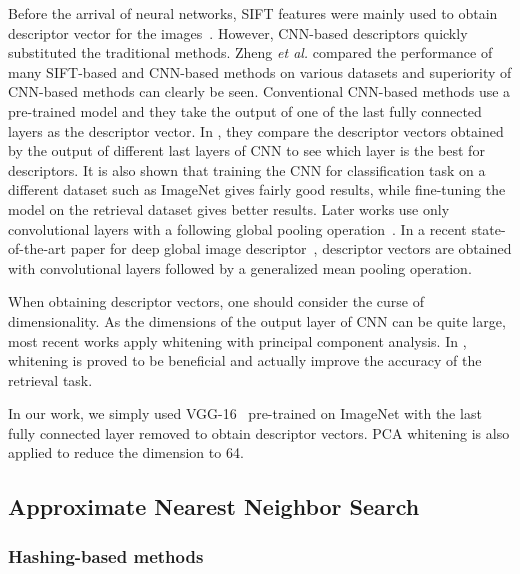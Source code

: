 Before the arrival of neural networks, SIFT features were mainly used to obtain descriptor vector for the images~\cite{philbin2007object}\cite{jegou2010aggregating}. 
However, CNN-based descriptors quickly substituted the traditional methods. 
Zheng \emph{et al.} compared the performance of many SIFT-based and CNN-based methods on various datasets and superiority of CNN-based methods can clearly be seen. 
Conventional CNN-based methods use a pre-trained model and they take the output of one of the last fully connected layers as the descriptor vector. 
In \cite{babenko2014neural}, they compare the descriptor vectors obtained by the output of different last layers of CNN to see which layer is the best for descriptors.
It is also shown that training the CNN for classification task on a different dataset such as ImageNet gives fairly good results, while fine-tuning the model on the retrieval dataset gives better results.
Later works use only convolutional layers with a following global pooling operation~\cite{razavian2016visual}\cite{tolias2015particular}. 
In a recent state-of-the-art paper for deep global image descriptor~\cite{radenovic2018fine}, descriptor vectors are obtained with convolutional layers followed by a generalized mean pooling operation.

When obtaining descriptor vectors, one should consider the curse of dimensionality. 
As the dimensions of the output layer of CNN can be quite large, most recent works apply whitening with principal component analysis. 
In \cite{jegou2012negative}, whitening is proved to be beneficial and actually improve the accuracy of the retrieval task.

In our work, we simply used VGG-16~\cite{simonyan2014very} pre-trained on ImageNet with the last fully connected layer removed to obtain descriptor vectors. PCA whitening is also applied to reduce the dimension to 64.

\subsection{Approximate Nearest Neighbor Search}

\subsubsection*{Hashing-based methods}

